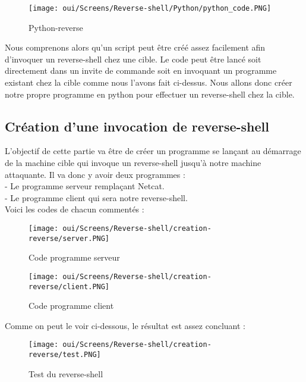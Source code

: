 \begin{figure}[htp!]
  \centering
  \setlength\figureheight{9cm}
  \setlength\figurewidth{7cm}
  \texttt{[image: oui/Screens/Reverse-shell/Python/python\_code.PNG]}
  \caption{Python-reverse}
  \label{fig:courbe-tikz}
\end{figure}

Nous comprenons alors qu'un script peut être créé assez facilement afin d'invoquer un reverse-shell chez une cible. Le code peut être lancé soit directement dans un invite de commande soit en invoquant un programme existant chez la cible comme nous l'avons fait ci-dessus. Nous allons donc créer notre propre programme en python pour effectuer un reverse-shell chez la cible.

\subsection{Création d'une invocation de reverse-shell}

L'objectif de cette partie va être de créer un programme se lançant au démarrage de la machine cible qui invoque un reverse-shell jusqu'à notre machine attaquante. Il va donc y avoir deux programmes :\\
- Le programme serveur remplaçant Netcat.\\
- Le programme client qui sera notre reverse-shell.\\

\newpage
Voici les codes de chacun commentés :

\begin{figure}[htp!]
  \centering
  \setlength\figureheight{9cm}
  \setlength\figurewidth{7cm}
  \texttt{[image: oui/Screens/Reverse-shell/creation-reverse/server.PNG]}
  \caption{Code programme serveur}
  \label{fig:courbe-tikz}
\end{figure}

\begin{figure}[htp!]
  \centering
  \setlength\figureheight{9cm}
  \setlength\figurewidth{7cm}
  \texttt{[image: oui/Screens/Reverse-shell/creation-reverse/client.PNG]}
  \caption{Code programme client}
  \label{fig:courbe-tikz}
\end{figure}

\newpage
Comme on peut le voir ci-dessous, le résultat est assez concluant :

\begin{figure}[htp!]
  \centering
  \setlength\figureheight{9cm}
  \setlength\figurewidth{7cm}
  \texttt{[image: oui/Screens/Reverse-shell/creation-reverse/test.PNG]}
  \caption{Test du reverse-shell}
  \label{fig:courbe-tikz}
\end{figure}

